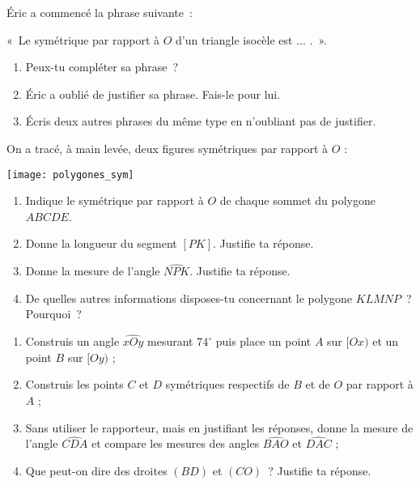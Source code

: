 \begin{exercice}
Éric a commencé la phrase suivante :
 \begin{center} « Le symétrique par rapport à $O$ d'un triangle isocèle est ... . ». \end{center}
 \begin{enumerate}
  \item Peux-tu compléter sa phrase ?
  \item Éric a oublié de justifier sa phrase. Fais-le pour lui.
  \item Écris deux autres phrases du même type en n'oubliant pas de justifier.
  \end{enumerate}
\end{exercice}


\begin{exercice}
On a tracé, à main levée, deux figures symétriques par rapport à $O$ :
 \begin{center} \texttt{[image: polygones\_sym]} \end{center}
\begin{enumerate}       
 \item Indique le symétrique par rapport à $O$ de chaque sommet du polygone $ABCDE$.
 \item Donne la longueur du segment $[PK]$. Justifie ta réponse.
 \item Donne la mesure de l'angle $\widehat{NPK}$. Justifie ta réponse.
 \item De quelles autres informations disposes-tu  concernant le polygone $KLMNP$ ? Pourquoi ?
 \end{enumerate}
\end{exercice}


\begin{exercice}
\begin{enumerate}
 \item Construis un angle $\widehat{xOy}$ mesurant $74^\circ$ puis place un point $A$ sur $[Ox)$ et un point $B$ sur $[Oy)$ ;
 \item Construis les points $C$ et $D$ symétriques respectifs de $B$ et de $O$ par rapport à $A$ ;
 \item Sans utiliser le rapporteur, mais en justifiant les réponses, donne la mesure de l'angle $\widehat{CDA}$ et compare les mesures des angles $\widehat{BAO}$ et $\widehat{DAC}$ ;
 \item Que peut-on dire des droites $(BD)$ et $(CO)$ ? Justifie ta réponse.
 \end{enumerate}
\end{exercice}


